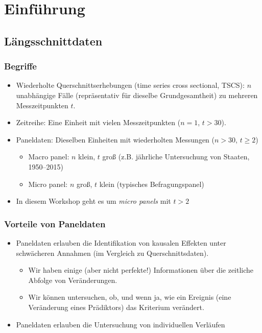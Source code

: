 \documentclass[
]{book}
\providecommand{\tightlist}{%
  \setlength{\itemsep}{0pt}\setlength{\parskip}{0pt}}
\begin{document}
\hypertarget{einfuxfchrung}{%
\chapter{Einführung}\label{einfuxfchrung}}

\hypertarget{luxe4ngsschnittdaten}{%
\section{Längsschnittdaten}\label{luxe4ngsschnittdaten}}

\hypertarget{begriffe}{%
\subsection*{Begriffe}\label{begriffe}}

\begin{itemize}
\tightlist
\item
  Wiederholte Querschnittserhebungen (time series cross sectional, TSCS): \(n\) unabhängige Fälle (repräsentativ für dieselbe Grundgesamtheit) zu mehreren Messzeitpunkten \(t\).
\item
  Zeitreihe: Eine Einheit mit vielen Messzeitpunkten (\(n = 1\), \(t > 30\)).
\item
  Paneldaten: Dieselben Einheiten mit wiederholten Messungen (\(n > 30\), \(t \ge 2\))

  \begin{itemize}
  \tightlist
  \item
    Macro panel: \(n\) klein, \(t\) groß (z.B. jährliche Untersuchung von Staaten, 1950--2015)
  \item
    Micro panel: \(n\) groß, \(t\) klein (typisches Befragungspanel)
  \end{itemize}
\item
  In diesem Workshop geht es um \emph{micro panels} mit \(t > 2\)
\end{itemize}

\hypertarget{vorteile-von-paneldaten}{%
\subsection*{Vorteile von Paneldaten}\label{vorteile-von-paneldaten}}

\begin{itemize}
\tightlist
\item
  Paneldaten erlauben die Identifikation von kausalen Effekten unter schwächeren Annahmen (im Vergleich zu Querschnittsdaten).

  \begin{itemize}
  \tightlist
  \item
    Wir haben einige (aber nicht perfekte!) Informationen über die zeitliche Abfolge von Veränderungen.
  \item
    Wir können untersuchen, ob, und wenn ja, wie ein Ereignis (eine Veränderung eines Prädiktors) das Kriterium verändert.
  \end{itemize}
\item
  Paneldaten erlauben die Untersuchung von individuellen Verläufen
\end{itemize}
\end{document}
